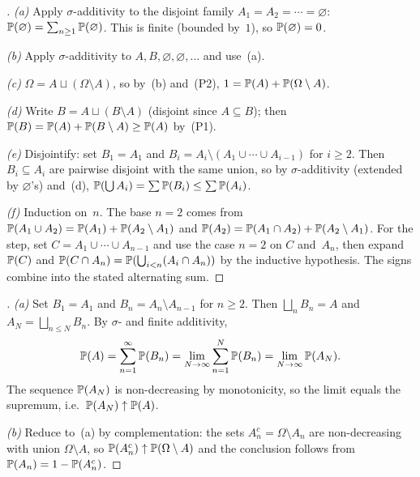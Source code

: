 \begin{proof}[]
\emph{(a)} Apply $\sigma$-additivity to the disjoint family
$A_1 = A_2 = \cdots = \varnothing$: $\mathbb{P}(\varnothing) = \sum_{n \geq 1} \mathbb{P}(\varnothing)$.
This is finite (bounded by~$1$), so $\mathbb{P}(\varnothing) = 0$.

\emph{(b)} Apply $\sigma$-additivity to $A, B, \varnothing, \varnothing, \dots$
and use~(a).

\emph{(c)} $\Omega = A \sqcup (\Omega \setminus A)$, so by~(b) and~(P2),
$1 = \mathbb{P}(A) + \mathbb{P}(\Omega \setminus A)$.

\emph{(d)} Write $B = A \sqcup (B \setminus A)$ (disjoint since
$A \subseteq B$); then $\mathbb{P}(B) = \mathbb{P}(A) + \mathbb{P}(B \setminus A) \geq \mathbb{P}(A)$
by~(P1).

\emph{(e)} Disjointify: set $B_1 = A_1$ and
$B_i = A_i \setminus (A_1 \cup \cdots \cup A_{i-1})$ for $i \geq 2$. Then
$B_i \subseteq A_i$ are pairwise disjoint with the same union, so by
$\sigma$-additivity (extended by $\varnothing$'s) and~(d),
$\mathbb{P}(\bigcup A_i) = \sum \mathbb{P}(B_i) \leq \sum \mathbb{P}(A_i)$.

\emph{(f)} Induction on~$n$. The base $n = 2$ comes from
$\mathbb{P}(A_1 \cup A_2) = \mathbb{P}(A_1) + \mathbb{P}(A_2 \setminus A_1)$ and
$\mathbb{P}(A_2) = \mathbb{P}(A_1 \cap A_2) + \mathbb{P}(A_2 \setminus A_1)$. For the
step, set $C = A_1 \cup \cdots \cup A_{n-1}$ and use the case $n = 2$
on $C$ and~$A_n$, then expand $\mathbb{P}(C)$ and $\mathbb{P}(C \cap A_n) = \mathbb{P}(\bigcup_{i < n}(A_i \cap A_n))$
by the inductive hypothesis. The signs combine into the stated
alternating sum.
\end{proof}

\begin{proof}[]
\emph{(a)} Set $B_1 = A_1$ and $B_n = A_n \setminus A_{n-1}$ for
$n \geq 2$. Then $\bigsqcup_{n} B_n = A$ and
$A_N = \bigsqcup_{n \leq N} B_n$. By $\sigma$- and finite additivity,
\[
  \mathbb{P}(A) = \sum_{n=1}^{\infty} \mathbb{P}(B_n) = \lim_{N \to \infty} \sum_{n=1}^{N} \mathbb{P}(B_n) = \lim_{N \to \infty} \mathbb{P}(A_N).
\]
The sequence $\mathbb{P}(A_N)$ is non-decreasing by monotonicity, so the
limit equals the supremum, i.e.\ $\mathbb{P}(A_N) \uparrow \mathbb{P}(A)$.

\emph{(b)} Reduce to~(a) by complementation: the sets
$A_n^{c} = \Omega \setminus A_n$ are non-decreasing with union
$\Omega \setminus A$, so $\mathbb{P}(A_n^{c}) \uparrow \mathbb{P}(\Omega \setminus A)$
and the conclusion follows from $\mathbb{P}(A_n) = 1 - \mathbb{P}(A_n^{c})$.
\end{proof}

